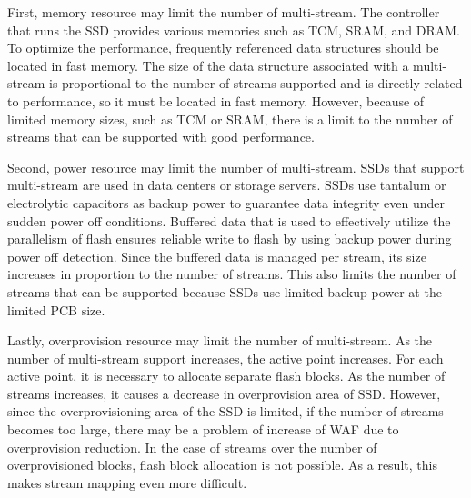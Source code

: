 First, memory resource may limit the number of multi-stream.
The controller that runs the SSD provides various memories such as TCM, SRAM, and DRAM. 
To optimize the performance, frequently referenced data structures should be located in fast memory.
The size of the data structure associated with a multi-stream is proportional to the number of streams supported and is directly related to performance, so it must be located in fast memory.
However, because of limited memory sizes, such as TCM or SRAM,
 there is a limit to the number of streams that can be supported with good performance.

Second, power resource may limit the number of multi-stream.
SSDs that support multi-stream are used in data centers or storage servers. SSDs use tantalum or electrolytic capacitors as backup power to guarantee data integrity even under sudden power off conditions.
Buffered data that is used to effectively utilize the parallelism of flash ensures reliable write to flash by using backup power during power off detection.
Since the buffered data is managed per stream, its size increases in proportion to the number of streams.
This also limits the number of streams that can be supported because SSDs use limited backup power at the limited PCB size.

Lastly, overprovision resource may limit the number of multi-stream.
As the number of multi-stream support increases, the active point increases. 
For each active point, it is necessary to allocate separate flash blocks.
 As the number of streams increases, it causes a decrease in overprovision area of SSD.
However, since the overprovisioning area of the SSD is limited, if the number of streams becomes too large, there may be a problem of increase of WAF due to overprovision reduction. 
In the case of streams over the number of overprovisioned blocks, flash block allocation  is not possible.
As a result, this makes stream mapping even more difficult.

